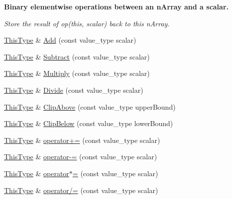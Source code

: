 \begin{Indent}{\bf Binary elementwise operations between an n\-Array and a scalar.}\par
{\em Store the result of op(this, scalar) back to this n\-Array. }\begin{DoxyCompactItemize}
\item 
\hyperlink{classvct_dynamic_const_n_array_base_a5123caffcf1455a1b99003877eade897}{This\-Type} \& \hyperlink{classvct_dynamic_n_array_base_af88d5b7c31a1d437dace088efb4a4381}{Add} (const value\-\_\-type scalar)
\item 
\hyperlink{classvct_dynamic_const_n_array_base_a5123caffcf1455a1b99003877eade897}{This\-Type} \& \hyperlink{classvct_dynamic_n_array_base_a6a5cf6ded7976f6d4fce24d6bea84232}{Subtract} (const value\-\_\-type scalar)
\item 
\hyperlink{classvct_dynamic_const_n_array_base_a5123caffcf1455a1b99003877eade897}{This\-Type} \& \hyperlink{classvct_dynamic_n_array_base_ac2cd87a03de241ea4dbc4047c84ec6b1}{Multiply} (const value\-\_\-type scalar)
\item 
\hyperlink{classvct_dynamic_const_n_array_base_a5123caffcf1455a1b99003877eade897}{This\-Type} \& \hyperlink{classvct_dynamic_n_array_base_a51a40fd2c5e4e979de62eb4dbbd3132e}{Divide} (const value\-\_\-type scalar)
\item 
\hyperlink{classvct_dynamic_const_n_array_base_a5123caffcf1455a1b99003877eade897}{This\-Type} \& \hyperlink{classvct_dynamic_n_array_base_ae0dea278c57e2543df8e7f25c8a2f3b7}{Clip\-Above} (const value\-\_\-type upper\-Bound)
\item 
\hyperlink{classvct_dynamic_const_n_array_base_a5123caffcf1455a1b99003877eade897}{This\-Type} \& \hyperlink{classvct_dynamic_n_array_base_aecd4a372764187d5eb95809c9b13082f}{Clip\-Below} (const value\-\_\-type lower\-Bound)
\item 
\hyperlink{classvct_dynamic_const_n_array_base_a5123caffcf1455a1b99003877eade897}{This\-Type} \& \hyperlink{classvct_dynamic_n_array_base_ae647bea07950c006fa6c485e8ddcc53d}{operator+=} (const value\-\_\-type scalar)
\item 
\hyperlink{classvct_dynamic_const_n_array_base_a5123caffcf1455a1b99003877eade897}{This\-Type} \& \hyperlink{classvct_dynamic_n_array_base_ad9af3a38ae067693ce2fd559d9ebdeae}{operator-\/=} (const value\-\_\-type scalar)
\item 
\hyperlink{classvct_dynamic_const_n_array_base_a5123caffcf1455a1b99003877eade897}{This\-Type} \& \hyperlink{classvct_dynamic_n_array_base_a40fad4a1b6bd4c1efd7af2e164ac2ad1}{operator$\ast$=} (const value\-\_\-type scalar)
\item 
\hyperlink{classvct_dynamic_const_n_array_base_a5123caffcf1455a1b99003877eade897}{This\-Type} \& \hyperlink{classvct_dynamic_n_array_base_af88c4fcd233a21e5daba0f5bbcde64be}{operator/=} (const value\-\_\-type scalar)
\end{DoxyCompactItemize}
\end{Indent}
